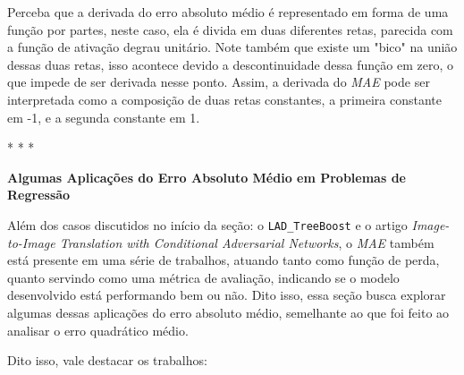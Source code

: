 Perceba que a derivada do erro absoluto médio é representado em forma de uma função por partes, neste caso, ela é divida em duas diferentes retas, parecida com a função de ativação degrau unitário. Note também que existe um "bico" na união dessas duas retas, isso acontece devido a descontinuidade dessa função em zero, o que impede de ser derivada nesse ponto. Assim, a derivada do \textit{MAE} pode ser interpretada como a composição de duas retas constantes, a primeira constante em -1, e a segunda constante em 1.

\medskip
\begin{center}
 * * *
\end{center}
\medskip

\textbf{Algumas Aplicações do Erro Absoluto Médio em Problemas de Regressão} 
\vspace{1em}

Além dos casos discutidos no início da seção: o \texttt{LAD\_TreeBoost} e o artigo \textit{Image-to-Image Translation with Conditional Adversarial Networks}, o \textit{MAE} também está presente em uma série de trabalhos, atuando tanto como função de perda, quanto servindo como uma métrica de avaliação, indicando se o modelo desenvolvido está performando bem ou não. Dito isso, essa seção busca explorar algumas dessas aplicações do erro absoluto médio, semelhante ao que foi feito ao analisar o erro quadrático médio. 

Dito isso, vale destacar os trabalhos:

